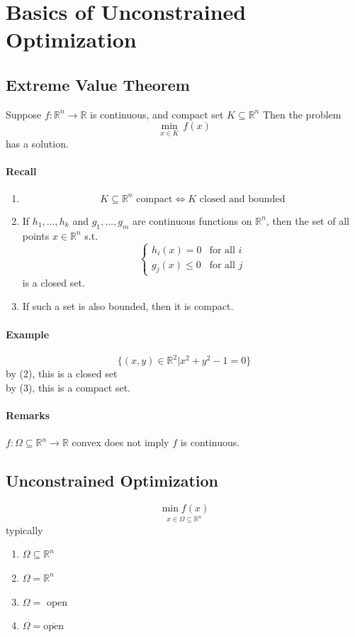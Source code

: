 \documentclass[11pt]{article}
\newcommand{\real}[0]{\mathbb{R}}
\begin{document}
\section{Basics of Unconstrained Optimization}
\subsection{Extreme Value Theorem}
Suppose $f: \real^n \rightarrow \real$ is continuous, and compact set $K \subseteq \real^n$
Then the problem
$$\underset{x \in K}{\min} \, f(x)$$ has a solution.

\paragraph{Recall}
\begin{enumerate}
	\item $$K \subseteq \real^n \text{ compact} \iff K \text{ closed and bounded}$$
	\item If $h_1, \hdots, h_k$ and $g_1, \hdots, g_m$ are continuous functions on $\real^n$, then the set of all points $x \in \real^n$ s.t.
	$$\begin{cases}
		h_i(x) = 0  &\text{for all $i$} \\
		g_j(x) \leq 0 &\text{for all $j$}
	\end{cases}$$
	is a closed set.
	\item If such a set is also bounded, then it is compact.
\end{enumerate}

\paragraph{Example}
$$\{(x,y) \in \real^2 | x^2 + y^2 -1 = 0 \}$$
by (2), this is a closed set \\
by (3), this is a compact set.

\paragraph{Remarks}
$f: \Omega \subseteq \real^n \rightarrow \real$ convex does not imply $f$ is continuous.

\subsection{Unconstrained Optimization}
$$\underset{x \in \Omega \subseteq \real^n}{\min f(x)}$$
typically
\begin{enumerate}
	\item $\Omega \subseteq \real^n$
	\item $\Omega = \real^n$
	\item $\Omega = $ open
	\item $\Omega = \overline{\text{open}}$ 
\end{enumerate}
\end{document}
